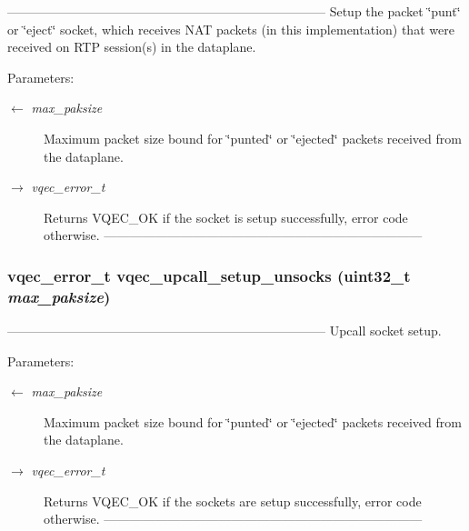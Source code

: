 --------------------------------------------------------------------------- Setup the packet \char`\"{}punt\char`\"{} or \char`\"{}eject\char`\"{} socket, which receives NAT packets (in this implementation) that were received on RTP session(s) in the dataplane.

\begin{Desc}
\item[Parameters:]
\begin{description}
\item[\mbox{$\leftarrow$} {\em max\_\-paksize}]Maximum packet size bound for \char`\"{}punted\char`\"{} or \char`\"{}ejected\char`\"{} packets received from the dataplane. \item[\mbox{$\rightarrow$} {\em vqec\_\-error\_\-t}]Returns VQEC\_\-OK if the socket is setup successfully, error code otherwise. --------------------------------------------------------------------------- \end{description}
\end{Desc}
\subsubsection{\setlength{\rightskip}{0pt plus 5cm}vqec\_\-error\_\-t vqec\_\-upcall\_\-setup\_\-unsocks (uint32\_\-t {\em max\_\-paksize})}\label{vqec__upcall__event_8c_d59208eecf5b3dafa404cf8438b25f66}


--------------------------------------------------------------------------- Upcall socket setup.

\begin{Desc}
\item[Parameters:]
\begin{description}
\item[\mbox{$\leftarrow$} {\em max\_\-paksize}]Maximum packet size bound for \char`\"{}punted\char`\"{} or \char`\"{}ejected\char`\"{} packets received from the dataplane. \item[\mbox{$\rightarrow$} {\em vqec\_\-error\_\-t}]Returns VQEC\_\-OK if the sockets are setup successfully, error code otherwise. --------------------------------------------------------------------------- \end{description}
\end{Desc}


